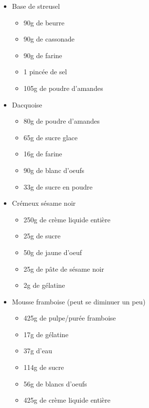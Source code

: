 \documentclass[]{book}
\providecommand{\tightlist}{%
  \setlength{\itemsep}{0pt}\setlength{\parskip}{0pt}}
\begin{document}
\begin{itemize}
\tightlist
\item
  Base de streusel

  \begin{itemize}
  \tightlist
  \item
    90g de beurre
  \item
    90g de cassonade
  \item
    90g de farine
  \item
    1 pincée de sel
  \item
    105g de poudre d'amandes
  \end{itemize}
\item
  Dacquoise

  \begin{itemize}
  \tightlist
  \item
    80g de poudre d'amandes
  \item
    65g de sucre glace
  \item
    16g de farine
  \item
    90g de blanc d'oeufs
  \item
    33g de sucre en poudre
  \end{itemize}
\item
  Crémeux sésame noir

  \begin{itemize}
  \tightlist
  \item
    250g de crème liquide entière
  \item
    25g de sucre
  \item
    50g de jaune d'oeuf
  \item
    25g de pâte de sésame noir
  \item
    2g de gélatine
  \end{itemize}
\item
  Mousse framboise (peut se diminuer un peu)

  \begin{itemize}
  \tightlist
  \item
    425g de pulpe/purée framboise
  \item
    17g de gélatine
  \item
    37g d'eau
  \item
    114g de sucre
  \item
    56g de blancs d'oeufs
  \item
    425g de crème liquide entière
  \end{itemize}
\end{itemize}
\end{document}
